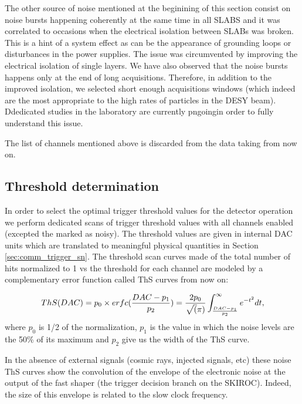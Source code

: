 \documentclass[a4paper,11pt]{article}
\begin{document}
The other source of noise mentioned at the beginining of this section
consist on noise bursts happening coherently at the same time in all SLABS
and it was correlated to occasions when the electrical isolation between SLABs was broken.
This is a hint of a system effect as can be the appearance of
grounding loops or disturbances in the power supplies.
The issue was circumvented by improving the electrical isolation of single layers.
We have also observed that the noise bursts happens only at the end of long acquisitions. Therefore, in addition to the improved isolation,
we selected short enough acquisitions windows (which indeed are the most appropriate to the high rates of particles in the DESY beam).
Ddedicated studies in the laboratory are currently pngoingin order to fully understand this issue.

The list of channels mentioned above is discarded from the data taking from now on.

\subsection{Threshold determination}
\label{sec:comm_trigger}

In order to select the optimal trigger threshold values for the detector operation
we perform dedicated scans of trigger threshold values
with all channels enabled (excepted the marked as noisy). 
The threshold values are given in internal DAC units which are translated to
meaningful physical quantities in Section \ref{sec:comm_trigger_sn}. 
The threshold scan curves made of the total number of hits normalized to 1 vs the threshold
for each channel are modeled by a complementary error function called ThS curves from now on:

\begin{equation}
ThS(DAC)=p_{0} \times erfc(\frac{DAC-p_{1}}{p_{2}}) = 
\newline
\frac{2p_{0}}{\sqrt(\pi)} \int_{\frac{DAC-p_{1}}{p_{2}}}^{\infty} e^{-t^{2}} dt,
\label{eq_S-curve}
\end{equation}
where $p_{0}$ is 1/2 of the normalization, $p_{1}$ is the value in which the noise levels are 
the 50\% of its maximum and $p_{2}$ give us the width of the ThS curve. 

In the absence of external signals (cosmic rays, injected signals, etc) 
these noise ThS curves show the convolution of the envelope of the 
electronic noise at the output of the fast shaper (the trigger decision branch on the SKIROC).
Indeed, the size of this envelope is related to the slow clock frequency.
\end{document}
